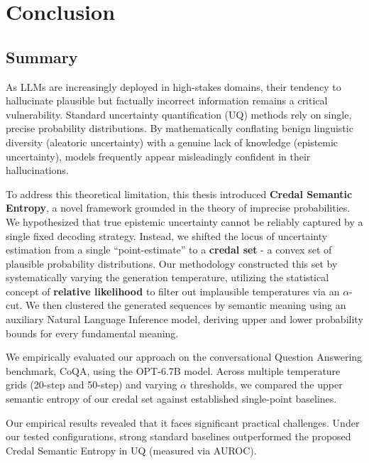 %
\chapter{Conclusion}
\label{sec:conclusion}
\section{Summary}
\label{sec:conclusion:summary}
As LLMs are increasingly deployed in high-stakes domains, their tendency to 
hallucinate plausible but factually incorrect information remains a critical
vulnerability. Standard uncertainty quantification (UQ) methods rely on single,
precise probability distributions. By mathematically conflating benign
linguistic diversity (aleatoric uncertainty) with a genuine lack of
knowledge (epistemic uncertainty), models frequently appear misleadingly 
confident in their hallucinations.

To address this theoretical limitation, this thesis introduced
\textbf{Credal Semantic Entropy}, a novel framework grounded in the theory 
of imprecise probabilities. We hypothesized that true epistemic uncertainty
cannot be reliably captured by a single fixed decoding strategy. Instead,
we shifted the locus of uncertainty estimation from a single 
``point-estimate'' to a \textbf{credal set} - a convex set of plausible 
probability distributions. Our methodology constructed this set by 
systematically varying the generation temperature, utilizing the statistical
concept of \textbf{relative likelihood} to filter out implausible 
temperatures via an $\alpha$-cut. We then clustered the generated sequences
by semantic meaning using an auxiliary Natural Language Inference
model, deriving upper and lower probability bounds for every
fundamental meaning.

We empirically evaluated our approach on the conversational Question 
Answering benchmark, CoQA, using the OPT-6.7B model. Across multiple 
temperature grids (20-step and 50-step) and varying $\alpha$ thresholds,
we compared the upper semantic entropy of our credal set against established
single-point baselines.

Our empirical results revealed that it faces significant practical challenges.
Under our
tested configurations, strong standard baselines outperformed the proposed
Credal Semantic Entropy in UQ (measured via AUROC).

